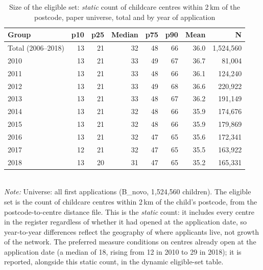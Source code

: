 \begin{table}[htbp]\centering
\caption{Size of the eligible set: \emph{static} count of childcare centres within 2\,km of the postcode, paper universe, total and by year of application}
\label{tab:N2}
\small
\setlength{\tabcolsep}{5pt}
\begin{tabular}{lrrrrrrr}
\toprule
Group & p10 & p25 & Median & p75 & p90 & Mean & N \\
\midrule
Total (2006--2018) & 13 & 21 & 32 & 48 & 66 & 36.0 & 1,524,560 \\
\midrule
2010 & 13 & 21 & 33 & 49 & 67 & 36.7 & 81,004 \\
2011 & 13 & 21 & 33 & 48 & 66 & 36.1 & 124,240 \\
2012 & 13 & 21 & 33 & 49 & 68 & 36.6 & 220,922 \\
2013 & 13 & 21 & 33 & 48 & 67 & 36.2 & 191,149 \\
2014 & 13 & 21 & 32 & 48 & 66 & 35.9 & 174,676 \\
2015 & 13 & 21 & 32 & 48 & 66 & 35.9 & 179,869 \\
2016 & 13 & 21 & 32 & 47 & 65 & 35.6 & 172,341 \\
2017 & 12 & 21 & 32 & 47 & 65 & 35.5 & 163,922 \\
2018 & 13 & 20 & 31 & 47 & 65 & 35.2 & 165,331 \\
\bottomrule
\end{tabular}
\\[3pt]{\footnotesize \textit{Note:} Universe: all first applications (B\_novo, 1,524,560 children). The eligible set is the count of childcare centres within 2\,km of the child's postcode, from the postcode-to-centre distance file. This is the \emph{static} count: it includes every centre in the register regardless of whether it had opened at the application date, so year-to-year differences reflect the geography of where applicants live, not growth of the network. The preferred measure conditions on centres already open at the application date (a median of 18, rising from 12 in 2010 to 29 in 2018); it is reported, alongside this static count, in the dynamic eligible-set table.}
\end{table}
